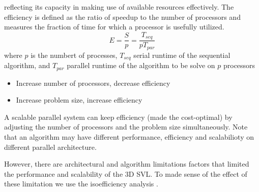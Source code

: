 \documentclass[a4paper, 11pt]{article}
\begin{document}
\begin{small}
\begin{itemize}
reflecting its capacity in making use of available resources effectively.
The efficiency is defined as the ratio of speedup to the number of processors and measures the fraction of time for which a processor is usefully utilized.
\begin{equation*}
E=\frac{S}{p} = \frac{T_{seq}}{pT_{par}}
\end{equation*}
where $p$ is the numbert of processes, $T_{seq}$ serial runtime of the sequential algorithm, and $T_{par}$ parallel runtime of the algorithm to be solve on $p$ processors
\begin{itemize}
\item Increase number of processors,  decrease efficiency
\item Increase problem size,  increase efficiency
\end{itemize}
A scalable parallel system can keep efficiency (made the cost-optimal) by adjusting the number of processors and the problem size simultaneously.
Note that an algorithm may have different performance, efficiency and scalabilioty on different parallel architecture.
\end{itemize}
However, there are architectural and algorithm limitations factors that limited the performance and scalability of the 3D SVL. 
To made sense of the effect of these limitation we use the isoefficiency analysis \cite{Yang_Tian_Hai}.

\end{small}
\end{document}
